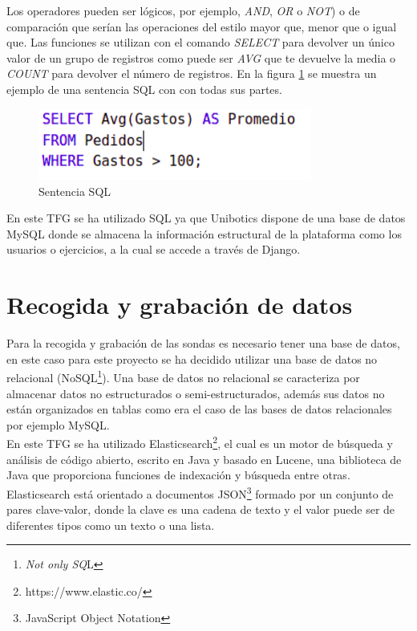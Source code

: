 Los operadores pueden ser lógicos, por ejemplo, \textit{AND}, \textit{OR} o \textit{NOT}) o de comparación que serían las operaciones del estilo mayor que, menor que o igual que. Las funciones se utilizan con el comando \textit{SELECT} para devolver un único valor de un grupo de registros como puede ser\textit{ AVG }que te devuelve la media o \textit{COUNT }para devolver el número de registros. En la figura \ref{fig:ejsql} se muestra un ejemplo de una sentencia SQL con con todas sus partes.\cite{sql}\\

\begin{figure}[H]
    \centering
    \includegraphics[width=9cm, keepaspectratio]{img/ejsql.png}
    \caption{Sentencia SQL}
    \label{fig:ejsql}
\end{figure}
En este TFG se ha utilizado SQL ya que Unibotics dispone de una base de datos MySQL donde se almacena la información estructural de la plataforma como los usuarios o ejercicios, a la cual se accede a través de Django.

\section{Recogida y grabación de datos}
Para la recogida y grabación de las sondas es necesario tener una base de datos, en este caso para este proyecto se ha decidido utilizar una base de datos no relacional (NoSQL\footnote{\textit{Not only SQ}L}). Una base de datos no relacional se caracteriza por almacenar datos no estructurados o semi-estructurados, además sus datos no están organizados en tablas como era el caso de las bases de datos relacionales por ejemplo MySQL.\\

En este TFG se ha utilizado Elasticsearch\footnote{https://www.elastic.co/}, el cual es un motor de búsqueda y análisis de código abierto, escrito en Java y basado en Lucene, una biblioteca de Java que proporciona funciones de indexación y búsqueda entre otras. Elasticsearch está orientado a documentos JSON\footnote{JavaScript Object Notation} formado por un conjunto de pares clave-valor, donde la clave es una cadena de texto y el valor puede ser de diferentes tipos como un texto o una lista.\cite{elastic}\\

